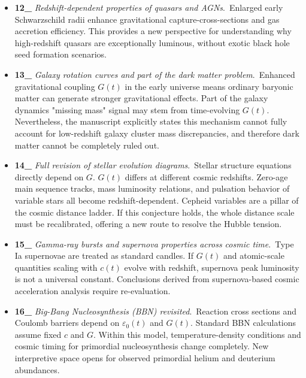 \documentclass[12pt,leqno]{article}
\begin{document}
{\begin{itemize}
		\item \textbf{12\_} \textit{Redshift-dependent properties of quasars and AGNs}.\,\,\,Enlarged early Schwarzschild radii enhance gravitational capture-cross-sections and gas accretion efficiency. This provides a new perspective for understanding why high-redshift quasars are exceptionally luminous, without exotic black hole seed formation scenarios.
		
		\item \textbf{13\_} \textit{Galaxy rotation curves and part of the dark matter problem}.\,\,\,Enhanced gravitational coupling $G(t)$ in the early universe means ordinary baryonic matter can generate stronger gravitational effects. Part of the galaxy dynamics "missing mass" signal may stem from time-evolving $G(t)$. Nevertheless, the manuscript explicitly states this mechanism cannot fully account for low-redshift galaxy cluster mass discrepancies, and therefore dark matter cannot be completely ruled out.
		
		\item \textbf{14\_} \textit{Full revision of stellar evolution diagrams}.\,\,\,Stellar structure equations directly depend on $G$. $G(t)$ differs at different cosmic redshifts. Zero-age main sequence tracks, mass luminosity relations, and pulsation behavior of variable stars all become redshift-dependent. Cepheid variables are a pillar of the cosmic distance ladder. If this conjecture holds, the whole distance scale must be recalibrated, offering a new route to resolve the Hubble tension.
		
		\item \textbf{15\_} \textit{Gamma-ray bursts and supernova properties across cosmic time}.\,\,\,Type Ia supernovae are treated as standard candles. If $G(t)$ and atomic-scale quantities scaling with $c(t)$ evolve with redshift, supernova peak luminosity is not a universal constant. Conclusions derived from supernova-based cosmic acceleration analysis require re-evaluation.
		
		\item \textbf{16\_} \textit{Big-Bang Nucleosynthesis (BBN) revisited}.\,\,\,Reaction cross sections and Coulomb barriers depend on $\varepsilon_0(t)$ and $G(t)$. Standard BBN calculations assume fixed $c$ and $G$. Within this model, temperature-density conditions and cosmic timing for primordial nucleosynthesis change completely. New interpretive space opens for observed primordial helium and deuterium abundances.
		

\end{itemize}}
\end{document}
